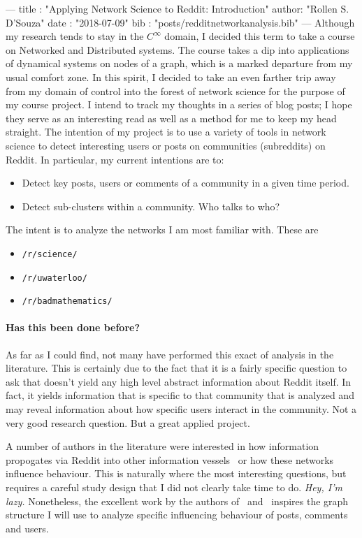 ---
title :   "Applying Network Science to Reddit: Introduction"
author:   "Rollen S. D'Souza"
date  :   "2018-07-09"
bib   :   "posts/redditnetworkanalysis.bib"
---
Although my research tends to stay in the \(C^\infty\) domain, I decided this term to take a course on Networked and Distributed systems.
The course takes a dip into applications of dynamical systems on nodes of a graph, which is a marked departure from my usual comfort zone.
In this spirit, I decided to take an even farther trip away from my domain of control into the forest of network science for the purpose of my course project.
I intend to track my thoughts in a series of blog posts;
I hope they serve as an interesting read as well as a method for me to keep my head straight.
The intention of my project is to use a variety of tools in network science to detect interesting users or posts on communities (subreddits) on Reddit.
In particular, my current intentions are to:
%
\begin{itemize}
 \item{Detect key posts, users or comments of a community in a given time period.}
 \item{Detect sub-clusters within a community. Who talks to who?}
\end{itemize}
%
The intent is to analyze the networks I am most familiar with.
These are
%
\begin{itemize}
  \item{\texttt{/r/science/}}
  \item{\texttt{/r/uwaterloo/}}
  \item{\texttt{/r/badmathematics/}}
\end{itemize}
%

\paragraph{Has this been done before?}
As far as I could find, not many have performed this exact of analysis in the literature.
This is certainly due to the fact that it is a fairly specific question to ask that doesn't yield any high level abstract information about Reddit itself.
In fact, it yields information that is specific to that community that is analyzed and may reveal information about how specific users interact in the community.
Not a very good research question.
But a great applied project.

A number of authors in the literature were interested in how information propogates via Reddit into other information vessels~\cite{c1} or how these networks influence behaviour.
This is naturally where the most interesting questions, but requires a careful study design that I did not clearly take time to do.
\emph{Hey, I'm lazy.}
Nonetheless, the excellent work by the authors of~\cite{c2} and~\cite{c3} inspires the graph structure I will use to analyze specific influencing behaviour of posts, comments and users.

